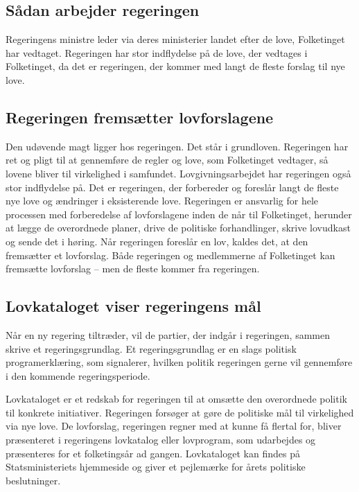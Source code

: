 \documentclass[]{book}
\begin{document}
\hypertarget{sadan-arbejder-regeringen}{%
\subsection{Sådan arbejder regeringen}\label{sadan-arbejder-regeringen}}

Regeringens ministre leder via deres ministerier landet efter de love, Folketinget har vedtaget. Regeringen har stor indflydelse på de love, der vedtages i Folketinget, da det er regeringen, der kommer med langt de fleste forslag til nye love.

\hypertarget{regeringen-fremstter-lovforslagene}{%
\subsection{Regeringen fremsætter lovforslagene}\label{regeringen-fremstter-lovforslagene}}

Den udøvende magt ligger hos regeringen. Det står i grundloven. Regeringen har ret og pligt til at gennemføre de regler og love, som Folketinget vedtager, så lovene bliver til virkelighed i samfundet.
Lovgivningsarbejdet har regeringen også stor indflydelse på. Det er regeringen, der forbereder og foreslår langt de fleste nye love og ændringer i eksisterende love. Regeringen er ansvarlig for hele processen med forberedelse af lovforslagene inden de når til Folketinget, herunder at lægge de overordnede planer, drive de politiske forhandlinger, skrive lovudkast og sende det i høring.
Når regeringen foreslår en lov, kaldes det, at den fremsætter et lovforslag. Både regeringen og medlemmerne af Folketinget kan fremsætte lovforslag -- men de fleste kommer fra regeringen.

\hypertarget{lovkataloget-viser-regeringens-mal}{%
\subsection{Lovkataloget viser regeringens mål}\label{lovkataloget-viser-regeringens-mal}}

Når en ny regering tiltræder, vil de partier, der indgår i regeringen, sammen skrive et regeringsgrundlag. Et regeringsgrundlag er en slags politisk programerklæring, som signalerer, hvilken politik regeringen gerne vil gennemføre i den kommende regeringsperiode.

Lovkataloget er et redskab for regeringen til at omsætte den overordnede politik til konkrete initiativer. Regeringen forsøger at gøre de politiske mål til virkelighed via nye love. De lovforslag, regeringen regner med at kunne få flertal for, bliver præsenteret i regeringens lovkatalog eller lovprogram, som udarbejdes og præsenteres for et folketingsår ad gangen.
Lovkataloget kan findes på Statsministeriets hjemmeside og giver et pejlemærke for årets politiske beslutninger.
\end{document}
